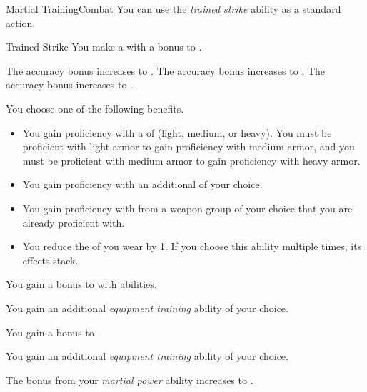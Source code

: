     \begin{feat}{Martial Training}{Combat}
         You can use the \textit{trained strike} ability as a standard action.
        \begin{freeability}{Trained Strike}
            You make a  with a  bonus to .

            \rankline
             The accuracy bonus increases to .
             The accuracy bonus increases to .
             The accuracy bonus increases to .
        \end{freeability}

         You choose one of the following benefits.
        \begin{itemize}
            \item You gain proficiency with a  of  (light, medium, or heavy).
                You must be proficient with light armor to gain proficiency with medium armor, and you must be proficient with medium armor to gain proficiency with heavy armor.
            \item You gain proficiency with an additional  of your choice.
            \item You gain proficiency with  from a weapon group of your choice that you are already proficient with.
            \item You reduce the  of  you wear by 1.
                If you choose this ability multiple times, its effects stack.
        \end{itemize}

         You gain a  bonus to  with  abilities.

         You gain an additional \textit{equipment training} ability of your choice.

         You gain a  bonus to .

         You gain an additional \textit{equipment training} ability of your choice.

         The bonus from your \textit{martial power} ability increases to .
    \end{feat}

